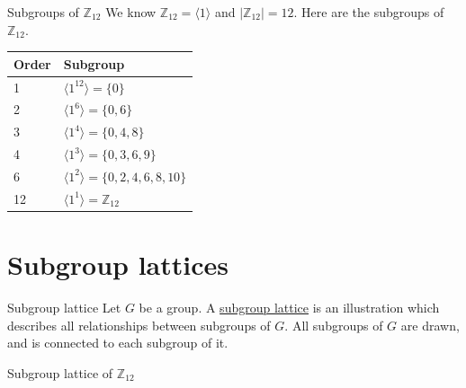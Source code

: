 \documentclass[12pt]{article}
\newcommand{\Z}{\mathbb{Z}}
\begin{document}
	\begin{myex}{Subgroups of $\Z_12$}{}
		We know $\Z_{12}=\langle 1\rangle$ and $|\Z_{12}|=12$. Here are the subgroups of $\Z_{12}$.
		
		\begin{tabular}{|l|l|}
		\hline
		Order & Subgroup \\ \hline
		1     & $\langle 1^{12}\rangle=\{0\}$\\ \hline
		2     & $\langle 1^{6}\rangle=\{0, 6\}$\\ \hline
		3     & $\langle 1^{4}\rangle=\{0, 4, 8\}$\\ \hline
		4     & $\langle 1^{3}\rangle=\{0, 3, 6, 9\}$\\ \hline
		6     & $\langle 1^{2}\rangle=\{0, 2, 4, 6, 8, 10\}$\\ \hline
		12    & $\langle 1^{1}\rangle=\Z_{12}$\\ \hline
		\end{tabular}
	\end{myex}
	
	\section{Subgroup lattices}
	\begin{mydef}{Subgroup lattice}{}
		Let $G$ be a group. A \underline{subgroup lattice} is an illustration which describes all relationships between subgroups of $G$. All subgroups of $G$ are drawn, and is connected to each subgroup of it.
	\end{mydef}
	
	\begin{myex}{Subgroup lattice of $\Z_{12}$}{}
	\end{myex}
	
\end{document}
